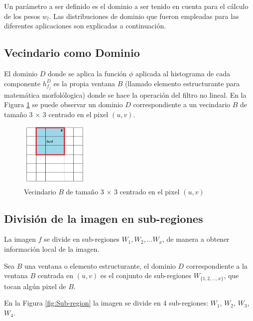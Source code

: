 Un par\'ametro a ser definido es el dominio a ser tenido en cuenta para el c\'alculo
de los pesos $w_l$. Las distribuciones de dominio que fueron empleadas para las diferentes aplicaciones son explicadas a continuaci\'on.

\subsection{Vecindario como Dominio}


El dominio $D$ donde se aplica la funci\'on $\phi$ aplicada al histograma de cada componente $h_{f_j}^D$ es la propia ventana $B$ (llamado elemento estructurante para matem\'atica morfol\'ologica) donde se hace la operaci\'on del filtro no lineal. En la Figura \ref{fig:Ventana B} se puede observar un dominio $D$ correspondiente a un vecindario $B$ de tama\~no 3 $\times$ 3 centrado en el pixel $(u,v)$.

\begin{figure}
	\centering
		\includegraphics[width=0.3\textwidth]{fig/VentanaB.jpg}
	\caption{Vecindario $B$ de tama\~no 3 $\times$ 3 centrado en el pixel $(u,v)$ }
	\label{fig:Ventana B}
\end{figure}

\subsection{Divisi\'on de la imagen en sub-regiones}

La imagen $f$ se divide en sub-regiones $W_1,W_2,\dots W_{x}$, de manera a obtener informaci\'on local de  la imagen. 

Sea $B$ una ventana o  elemento estructurante, el dominio $D$ correspondiente a la ventana $B$ centrada en $(u,v)$ es el conjunto de sub-regiones $W_{\{1,2,...,x\}}$, que tocan alg\'un pixel de $B$.

En la Figura \ref{fig:Sub-region} la imagen se divide en 4 sub-regiones: $W_1$, $W_2$, $W_3$, $W_4$.

